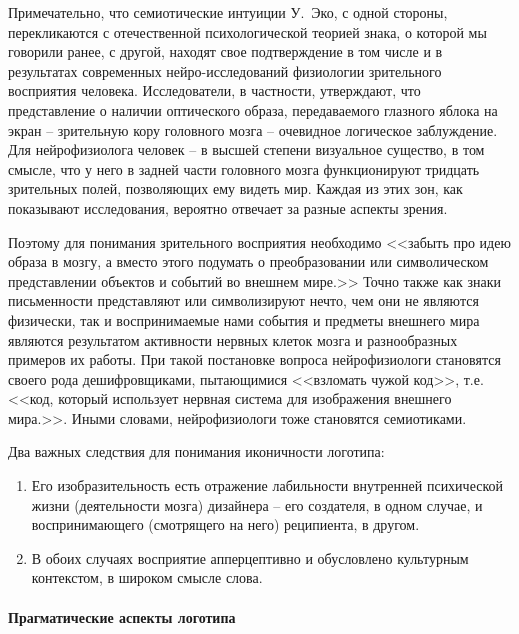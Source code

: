 Примечательно, что семиотические интуиции У.~Эко, с одной стороны, перекликаются
с отечественной психологической теорией знака, о которой мы говорили ранее,
с другой,  находят свое подтверждение в том числе и в результатах современных
нейро-исследований физиологии зрительного восприятия человека. Исследователи,
в частности, утверждают, что представление о наличии оптического образа,
передаваемого глазного яблока на экран -- зрительную кору головного мозга --
очевидное логическое заблуждение. Для нейрофизиолога человек -- в высшей степени
визуальное существо, в том смысле, что у него в задней части головного
мозга функционируют тридцать зрительных полей, позволяющих ему видеть мир.
Каждая из этих зон, как показывают исследования, вероятно отвечает за разные
аспекты зрения\autocite{velyanur2006}.

Поэтому для понимания зрительного восприятия необходимо <<забыть про идею образа
в мозгу, а вместо этого подумать о преобразовании или символическом
представлении объектов и событий во внешнем мире.>> \autocite[][33-34]{velyanur2006}
Точно также как знаки письменности представляют или символизируют нечто,
чем они не являются физически, так и воспринимаемые нами события и предметы
внешнего мира являются результатом активности нервных клеток мозга и
разнообразных примеров их работы. При такой постановке вопроса нейрофизиологи
становятся своего рода дешифровщиками, пытающимися <<взломать чужой код>>,
т.е. <<код, который использует нервная система для изображения внешнего мира.>>\autocite[][34]{velyanur2006}.
Иными словами, нейрофизиологи тоже становятся семиотиками.

Два важных следствия для понимания иконичности логотипа:
\begin{enumerate}
\item Его изобразительность есть отражение лабильности внутренней
  психической жизни (деятельности мозга) дизайнера -- его создателя, в одном
  случае, и воспринимающего (смотрящего на него) реципиента, в другом.
\item В обоих случаях восприятие апперцептивно и обусловлено культурным
  контекстом, в широком смысле слова.
\end{enumerate}

\paragraph{Прагматические аспекты логотипа}


